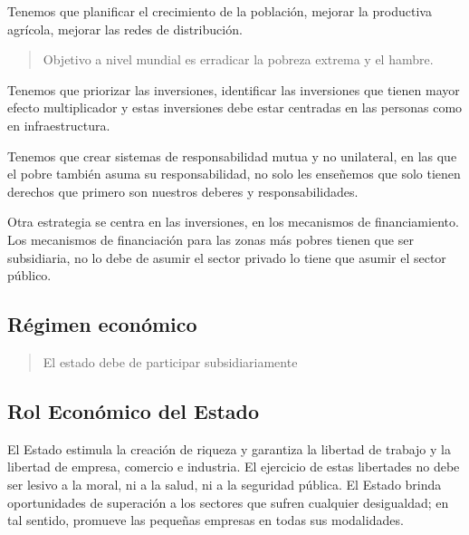 \documentclass[
  a4paper,
]{article}
\begin{document}
Tenemos que planificar el crecimiento de la población, mejorar la
productiva agrícola, mejorar las redes de distribución.

\begin{quote}
Objetivo a nivel mundial es erradicar la pobreza extrema y el hambre.
\end{quote}

Tenemos que priorizar las inversiones, identificar las inversiones que
tienen mayor efecto multiplicador y estas inversiones debe estar
centradas en las personas como en infraestructura.

Tenemos que crear sistemas de responsabilidad mutua y no unilateral, en
las que el pobre también asuma su responsabilidad, no solo les enseñemos
que solo tienen derechos que primero son nuestros deberes y
responsabilidades.

Otra estrategia se centra en las inversiones, en los mecanismos de
financiamiento. Los mecanismos de financiación para las zonas más pobres
tienen que ser subsidiaria, no lo debe de asumir el sector privado lo
tiene que asumir el sector público.

\hypertarget{ruxe9gimen-econuxf3mico}{%
\subsection{Régimen económico}\label{ruxe9gimen-econuxf3mico}}

\begin{quote}
El estado debe de participar subsidiariamente
\end{quote}

\hypertarget{rol-econuxf3mico-del-estado}{%
\subsection{Rol Económico del
Estado}\label{rol-econuxf3mico-del-estado}}

El Estado estimula la creación de riqueza y garantiza la libertad de
trabajo y la libertad de empresa, comercio e industria. El ejercicio de
estas libertades no debe ser lesivo a la moral, ni a la salud, ni a la
seguridad pública. El Estado brinda oportunidades de superación a los
sectores que sufren cualquier desigualdad; en tal sentido, promueve las
pequeñas empresas en todas sus modalidades.
\end{document}
